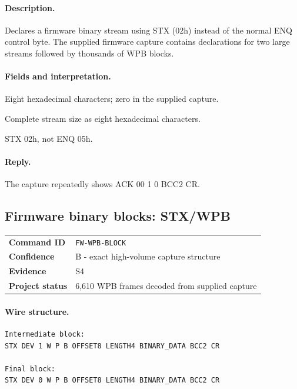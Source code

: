 \documentclass[10pt,letterpaper]{article}
\begin{document}
\paragraph{Description.} Declares a firmware binary stream using STX (02h) instead of the normal ENQ control byte. The supplied firmware capture contains declarations for two large streams followed by thousands of WPB blocks.
\paragraph{Fields and interpretation.}
\begin{description}[style=nextline,leftmargin=3.2cm,labelwidth=3.0cm,font=\normalfont\bfseries]
\item[BASE8] Eight hexadecimal characters; zero in the supplied capture.
\item[TOTAL8] Complete stream size as eight hexadecimal characters.
\item[Control byte] STX 02h, not ENQ 05h.
\end{description}
\paragraph{Reply.} The capture repeatedly shows ACK 00 1 0 BCC2 CR.

\subsection{Firmware binary blocks: STX/WPB}
\begin{tabularx}{\textwidth}{@{}>{\bfseries}p{2.8cm}X@{}}
Command ID & \texttt{FW-WPB-BLOCK} \\
Confidence & B - exact high-volume capture structure \\
Evidence & S4 \\
Project status & 6,610 WPB frames decoded from supplied capture \\
\end{tabularx}
\vspace{0.35em}
\paragraph{Wire structure.}
\begin{Verbatim}[breaklines=true,breakanywhere=true,fontsize=\small]
Intermediate block:
STX DEV 1 W P B OFFSET8 LENGTH4 BINARY_DATA BCC2 CR

Final block:
STX DEV 0 W P B OFFSET8 LENGTH4 BINARY_DATA BCC2 CR
\end{Verbatim}
\end{document}
